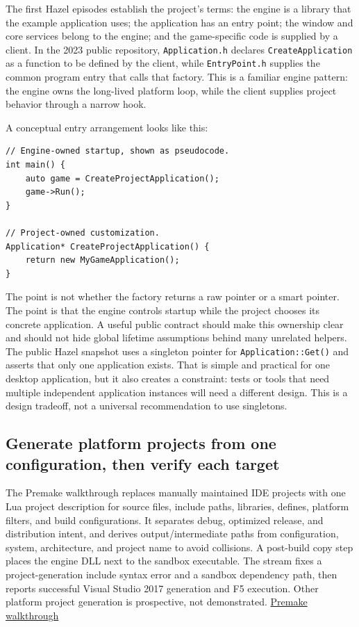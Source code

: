 The first Hazel episodes establish the project's terms: the engine is a library that the example application uses; the application has an entry point; the window and core services belong to the engine; and the game-specific code is supplied by a client. In the 2023 public repository, \texttt{Application.h} declares \texttt{CreateApplication} as a function to be defined by the client, while \texttt{EntryPoint.h} supplies the common program entry that calls that factory. This is a familiar engine pattern: the engine owns the long-lived platform loop, while the client supplies project behavior through a narrow hook.

A conceptual entry arrangement looks like this:

\begin{verbatim}
// Engine-owned startup, shown as pseudocode.
int main() {
    auto game = CreateProjectApplication();
    game->Run();
}

// Project-owned customization.
Application* CreateProjectApplication() {
    return new MyGameApplication();
}
\end{verbatim}

The point is not whether the factory returns a raw pointer or a smart pointer. The point is that the engine controls startup while the project chooses its concrete application. A useful public contract should make this ownership clear and should not hide global lifetime assumptions behind many unrelated helpers. The public Hazel snapshot uses a singleton pointer for \texttt{Application::Get()} and asserts that only one application exists. That is simple and practical for one desktop application, but it also creates a constraint: tests or tools that need multiple independent application instances will need a different design. This is a design tradeoff, not a universal recommendation to use singletons.

\subsection{Generate platform projects from one configuration, then verify each target}\label{05-engine-i-ch013-generate-platform-projects-from-one-configuration-then-verify-each-target}

The Premake walkthrough replaces manually maintained IDE projects with one Lua project description for source files, include paths, libraries, defines, platform filters, and build configurations. It separates debug, optimized release, and distribution intent, and derives output/intermediate paths from configuration, system, architecture, and project name to avoid collisions. A post-build copy step places the engine DLL next to the sandbox executable. The stream fixes a project-generation include syntax error and a sandbox dependency path, then reports successful Visual Studio 2017 generation and F5 execution. Other platform project generation is prospective, not demonstrated. \href{https://www.youtube.com/watch?v=sULV3aB2qeU}{Premake walkthrough}

